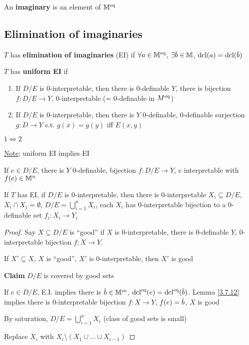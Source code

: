 \documentclass[11pt]{article}
\begin{document}
An \textbf{imaginary} is an element of \(\mathbb{M}^{\operatorname{eq}}\)


\subsection{Elimination of imaginaries}
\label{sec:org7fc98f4}
\begin{definition}[]
\(T\) has \textbf{elimination of imaginaries} (EI) if \(\forall a\in\mathbb{M}^{\operatorname{eq}}\), \(\exists\barb\in\M\), \(\dcl(a)=\dcl(\barb)\)
\end{definition}

\begin{definition}[]
\(T\) has \textbf{uniform EI} if
\begin{enumerate}
\item If \(D/E\)  is 0-interpretable, then there is 0-definable \(Y\), there is
bijection \(f:D/E\to Y\), 0-interpretable (= 0-definable in \(M^{\operatorname{eq}}\))
\item If \(D/E\) is 0-interpretable, then there is \(Y\) 0-definable, 0-definable
surjection \(g:D\to Y\) s.t. \(g(x)=g(y)\) iff \(E(x,y)\)
\end{enumerate}


\(1\Leftrightarrow 2\)
\end{definition}


\uline{Note}: uniform EI implies EI

If \(e\in D/E\), there is \(Y\) 0-definable, bijection \(f:D/E\to Y\), \(e\) interpretable
with \(f(e)\in\mathbb{M}^n\)

\begin{lemma}[]
\label{4.7.25}
If \(T\) has EI, if \(D/E\) is 0-interpretable, then there is
0-interpretable \(X_i\subseteq D/E\), \(X_i\cap X_j=\emptyset\), \(D/E=\bigcup_{i=1}^nX_i\), each \(X_i\) has 0-interpretable
bijection to a 0-definable set \(f_i:X_i\to Y_i\)
\end{lemma}

\begin{proof}
Say \(X\subseteq D/E\) is ``good'' if \(X\) is 0-interpretable, there is 0-definable \(Y\),
0-interpretable bijection \(f:X\to Y\).

If \(X'\subseteq X\), \(X\) is ``good'', \(X'\) is 0-interpretable, then \(X'\) is good

\textbf{Claim} \(D/E\) is covered by good sets

If \(e\in D/E\), E.I. implies there is \(\barb\in\M^m\), \(\dcl^{\eq}(e)=\dcl^{\eq}(\barb)\). Lemma
\ref{3.7.12} implies there is 0-interpretable bijection \(f:X\to Y\), \(f(e)=\barb\), \(X\) is good

By saturation, \(D/E=\bigcup_{i=1}^nX_i\) (class of good sets is small)

Replace \(X_i\) with \(X_i\setminus(X_1\cup\dots\cup X_{i-1})\)
\end{proof}
\end{document}
